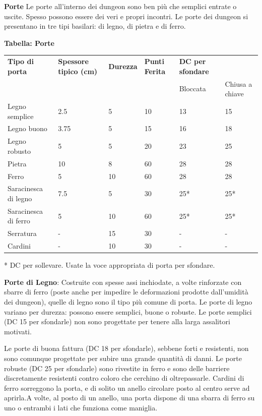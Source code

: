 \documentclass[a4paper,11pt,twoside,openany]{book}
\begin{document}
\textbf{Porte} Le porte all'interno dei dungeon sono ben più che semplici entrate o uscite. Spesso possono essere dei veri e propri incontri. Le porte dei dungeon si presentano in tre tipi basilari: di legno, di pietra e di ferro.

\bigskip

\textbf{Tabella: Porte}

\bigskip

\begin{tabularx}{0.95\textwidth}{llllll}
	\toprule
	\textbf{Tipo di porta} & \textbf{Spessore tipico (cm)} & \textbf{Durezza} & \textbf{Punti Ferita} & \textbf{DC per sfondare} \\
    &&   &   & Bloccata  & Chiusa a chiave\\
	Legno semplice    & 2.5  & 5 & 10& 13   & 15\\
	Legno buono  & 3.75 & 5 & 15& 16   & 18\\
	Legno robusto& 5    & 5 & 20& 23   & 25\\
	Pietra  & 10   & 8 & 60& 28   & 28\\
	Ferro   & 5    & 10& 60& 28   & 28\\
	Saracinesca di legno   & 7.5  & 5 & 30& 25{*}& 25{*}\\
	Saracinesca di ferro   & 5    & 10& 60& 25{*}& 25{*}\\
	Serratura    & -    & 15& 30& -    & -\\
	Cardini & -    & 10& 30& -    & -\\
\end{tabularx}

{*} DC per sollevare. Usate la voce appropriata di porta per sfondare.

\bigskip

\textbf{Porte di Legno}: Costruite con spesse assi inchiodate, a volte rinforzate con sbarre di ferro (poste anche per impedire le deformazioni prodotte dall'umidità dei dungeon), quelle di legno sono il tipo più comune di porta. Le porte di legno variano per durezza: possono essere semplici, buone o robuste. Le porte semplici (DC 15 per sfondarle) non sono progettate per tenere alla larga assalitori motivati.

Le porte di buona fattura (DC 18 per sfondarle), sebbene forti e resistenti, non sono comunque progettate per subire una grande quantità di danni. Le porte robuste (DC 25 per sfondarle) sono rivestite in ferro e sono delle barriere discretamente resistenti contro coloro che cerchino di oltrepassarle. Cardini di ferro sorreggono la porta, e di solito un anello circolare posto al centro serve ad aprirla.A volte, al posto di un anello, una porta dispone di una sbarra di ferro su uno o entrambi i lati che funziona come maniglia.
\end{document}
